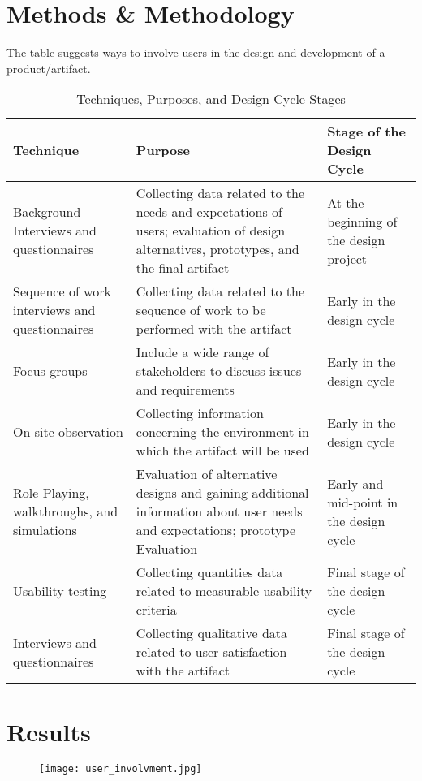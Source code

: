 \documentclass{article}
\begin{document}
\section{Methods \& Methodology}
The table suggests ways to involve users in the design and development of a product/artifact.
\begin{table}[H]
    \centering
    \begin{tabular}{|m{}|m{}|m{}|}
    \hline
    \textbf{Technique} & \textbf{Purpose} & \textbf{Stage of the Design Cycle} \\
    \hline
    Background Interviews and questionnaires & Collecting data related to the needs and expectations of users; evaluation of design alternatives, prototypes, and the final artifact & At the beginning of the design project \\
    \hline
    Sequence of work interviews and questionnaires & Collecting data related to the sequence of work to be performed with the artifact & Early in the design cycle \\
    \hline
    Focus groups & Include a wide range of stakeholders to discuss issues and requirements & Early in the design cycle \\
    \hline
    On-site observation & Collecting information concerning the environment in which the artifact will be used & Early in the design cycle \\
    \hline
    Role Playing, walkthroughs, and simulations & Evaluation of alternative designs and gaining additional information about user needs and expectations; prototype Evaluation & Early and mid-point in the design cycle \\
    \hline
     Usability testing & Collecting quantities data related to measurable usability criteria & Final stage of the design cycle \\
    \hline
     Interviews and questionnaires & Collecting qualitative data related to user satisfaction with the artifact & Final stage of the design cycle \\
    \hline
    \end{tabular}
    \caption{Techniques, Purposes, and Design Cycle Stages}
\end{table}

\section{Results}
\begin{figure}[htbp]
    \hspace*{-3cm} 
    \texttt{[image: user\_involvment.jpg]}
\end{figure}
\end{document}

